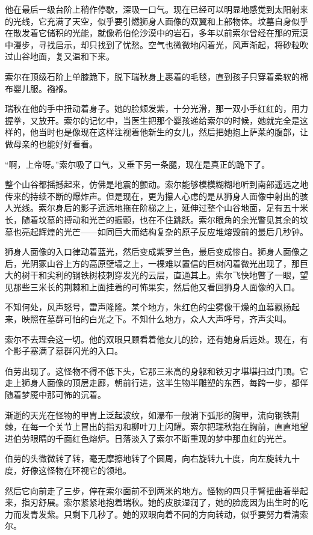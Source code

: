 \documentclass[AutoFakeBold=true]{book}
\begin{document}
他在最后一级台阶上稍作停歇，深吸一口气。现在已经可以明显地感觉到太阳射来的光线，它充满了天空，似乎要引燃狮身人面像的双翼和上部物体。坟墓自身似乎在散发着它储积的光能，就像希伯伦沙漠中的岩石，多年以前索尔曾经在那的荒漠中漫步，寻找启示，却只找到了忧愁。空气也微微地闪着光，风声渐起，将砂粒吹过山谷地面，复又温和下来。

索尔在顶级石阶上单膝跪下，脱下瑞秋身上裹着的毛毯，直到孩子只穿着柔软的棉布婴儿服。襁褓。

瑞秋在他的手中扭动着身子。她的脸颊发紫，十分光滑，那一双小手红红的，用力握拳，又放开。索尔的记忆中，当医生把那个婴孩递给索尔的时候，她就完全是这样的，他当时也是像现在这样注视着他新生的女儿，然后把她抱上萨莱的腹部，让做母亲的也能好好看看。

``啊，上帝呀。''索尔吸了口气，又垂下另一条腿，现在是真正的跪下了。

整个山谷都摇撼起来，仿佛是地震的颤动。索尔能够模模糊糊地听到南部遥远之地传来的持续不断的爆炸声。但是现在，更为攥人心虑的是从狮身人面像中射出的骇人光线。索尔身后的影子远远地拖在阶梯之上，延伸过整个山谷地面，足有五十米长，随着坟墓的搏动和光芒的振颤，也在不住跳跃。索尔眼角的余光瞥见其余的坟墓也亮起辉煌的光芒——如同巨大而结构复杂的原子反应堆熔毁前的最后几秒钟。

狮身人面像的入口律动着蓝光，然后变成紫罗兰色，最后变成惨白。狮身人面像之后，光阴冢山谷上方的高原壁墙之上，一棵难以置信的巨树闪着微光出现了，那巨大的树干和尖利的钢铁树枝刺穿发光的云层，直通其上。索尔飞快地瞥了一眼，望见那些三米长的荆棘和上面挂着的可怖果实，然后他又看回狮身人面像的入口。

不知何处，风声怒号，雷声隆隆。某个地方，朱红色的尘雾像干燥的血幕飘扬起来，映照在墓群可怕的白光之下。不知什么地方，众人大声呼号，齐声尖叫。

索尔不去理会这一切。他的双眼只顾看着他女儿的脸，还有她身后远处。现在，有个影子塞满了墓群闪光的入口。

伯劳出现了。这怪物不得不低下头，它那三米高的身躯和铁刃才堪堪扫过门顶。它走上狮身人面像的顶层走廊，朝前行进，这半生物半雕塑的东西，每跨一步，都伴随着梦魇中那可怖的沉着。

渐逝的天光在怪物的甲胄上泛起波纹，如瀑布一般淌下弧形的胸甲，流向钢铁荆棘，在每一个关节上冒出的指刃和柳叶刀上闪耀。索尔把瑞秋抱在胸前，直直地望进伯劳眼睛的千面红色熔炉。日落淡入了索尔不断重现的梦中那血红的光芒。

伯劳的头微微转了转，毫无摩擦地转了个圆周，向右旋转九十度，向左旋转九十度，好像这怪物在环视它的领地。

然后它向前走了三步，停在索尔面前不到两米的地方。怪物的四只手臂扭曲着举起来，指刃舒展。索尔紧紧地抱着瑞秋。她的皮肤湿润了，她的脸庞因为出生时的吃力而发青发紫。只剩下几秒了。她的双眼向着不同的方向转动，似乎要努力看清索尔。
\end{document}
